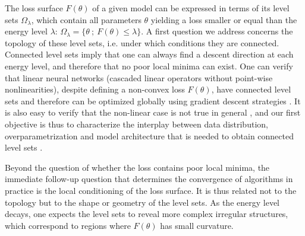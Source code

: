 The loss surface $F(\theta)$ of a given model can be expressed in terms of its level sets $\Omega_\lambda$, which contain all parameters $\theta$ yielding a loss smaller or equal than the energy level $\lambda$: $\Omega_\lambda = \{ \theta ~;~F(\theta) \leq \lambda\}$. 
A first question we address concerns the topology of these level sets, i.e. under which conditions they are connected. Connected level sets imply that one can always find a descent direction at each energy level, and therefore that no poor local minima can exist. One can verify that linear neural networks (cascaded linear operators without point-wise nonlinearities), despite defining a non-convex loss $F(\theta)$, have connected level sets and therefore can be optimized globally using gradient descent strategies \cite{danieljoan}. It is also easy to verify that the non-linear case is not true in general \cite{shamir}, and our first objective is thus to characterize the interplay between data distribution, overparametrization and model architecture that is needed to obtain connected level sets \cite{danieljoan}.

Beyond the question of whether the loss contains poor local minima, the immediate follow-up question that determines the convergence of algorithms in practice is the local conditioning of the loss surface. It is thus related not to the topology but to the shape or geometry of the level sets. As the energy level decays, one expects the level sets to reveal more complex irregular structures, which correspond to regions where $F(\theta)$ has small curvature.